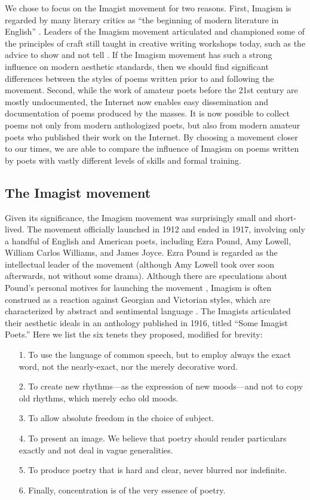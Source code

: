\documentclass{book}
\begin{document}
We chose to focus on the Imagist movement for two reasons. First, Imagism is regarded by many literary critics as ``the beginning of modern literature in English'' \citep{pratt1992imagism}. Leaders of the Imagism movement articulated and championed some of the principles of craft still taught in creative writing workshops today, such as the advice to show and not tell \citep{PoetsCompanion, Burroway}. If the Imagism movement has such a strong influence on modern aesthetic standards, then we should find significant differences between the styles of poems written prior to and following the movement. Second, while the work of amateur poets before the 21st century are mostly undocumented, the Internet now enables easy dissemination and documentation of poems produced by the masses. It is now possible to collect poems not only from modern anthologized poets, but also from modern amateur poets who published their work on the Internet. By choosing a movement closer to our times, we are able to compare the influence of Imagism on poems written by poets with vastly different levels of skills and formal training. 

\subsection*{The Imagist movement}

Given its significance, the Imagism movement was surprisingly small and short-lived. The movement officially launched in 1912 and ended in 1917, involving only a handful of English and American poets, including Ezra Pound, Amy Lowell, William Carlos Williams, and James Joyce. Ezra Pound is regarded as the intellectual leader of the movement (although Amy Lowell took over soon afterwards, not without some drama). Although there are speculations about Pound's personal motives for launching the movement \citep{thacker2011imagist}, Imagism is often construed as a reaction against Georgian and Victorian styles, which are characterized by abstract and sentimental language \citep{frank1991idea}. The Imagists articulated their aesthetic ideals in an anthology published in 1916, titled ``Some Imagist Poets.'' Here we list the six tenets they proposed, modified for brevity:
\begin{itemize}
\item[1.] To use the language of common speech, but to employ always the exact word, not the nearly-exact, nor the merely decorative word.
\item[2.] To create new rhythms---as the expression of new moods---and not to copy old rhythms, which merely echo old moods. 
\item[3.] To allow absolute freedom in the choice of subject.
\item[4.] To present an image. We believe that poetry should render particulars exactly and not deal in vague generalities.
\item[5.] To produce poetry that is hard and clear, never blurred nor indefinite.
\item[6.] Finally, concentration is of the very essence of poetry.
\end{itemize}
\end{document}
